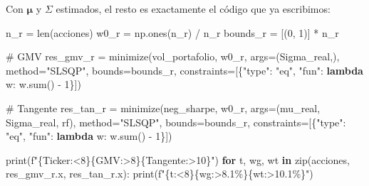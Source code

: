 \documentclass[
  spanish,
  letterpaper,
  DIV=11,
  numbers=noendperiod]{scrreprt}
\newenvironment{Shaded}{\begin{snugshade}}{\end{snugshade}}
\newcommand{\BuiltInTok}[1]{\textcolor[rgb]{0.00,0.23,0.31}{#1}}
\newcommand{\CommentTok}[1]{\textcolor[rgb]{0.37,0.37,0.37}{#1}}
\newcommand{\ControlFlowTok}[1]{\textcolor[rgb]{0.00,0.23,0.31}{\textbf{#1}}}
\newcommand{\DecValTok}[1]{\textcolor[rgb]{0.68,0.00,0.00}{#1}}
\newcommand{\KeywordTok}[1]{\textcolor[rgb]{0.00,0.23,0.31}{\textbf{#1}}}
\newcommand{\NormalTok}[1]{\textcolor[rgb]{0.00,0.23,0.31}{#1}}
\newcommand{\OperatorTok}[1]{\textcolor[rgb]{0.37,0.37,0.37}{#1}}
\newcommand{\SpecialCharTok}[1]{\textcolor[rgb]{0.37,0.37,0.37}{#1}}
\newcommand{\SpecialStringTok}[1]{\textcolor[rgb]{0.13,0.47,0.30}{#1}}
\newcommand{\StringTok}[1]{\textcolor[rgb]{0.13,0.47,0.30}{#1}}
\begin{document}
Con \(\boldsymbol{\mu}\) y \(\Sigma\) estimados, el resto es exactamente
el código que ya escribimos:

\label{datos-reales-optimizacion}
\begin{Shaded}
\begin{Highlighting}[]
\NormalTok{n\_r }\OperatorTok{=} \BuiltInTok{len}\NormalTok{(acciones)}
\NormalTok{w0\_r }\OperatorTok{=}\NormalTok{ np.ones(n\_r) }\OperatorTok{/}\NormalTok{ n\_r}
\NormalTok{bounds\_r }\OperatorTok{=}\NormalTok{ [(}\DecValTok{0}\NormalTok{, }\DecValTok{1}\NormalTok{)] }\OperatorTok{*}\NormalTok{ n\_r}

\CommentTok{\# GMV}
\NormalTok{res\_gmv\_r }\OperatorTok{=}\NormalTok{ minimize(vol\_portafolio, w0\_r, args}\OperatorTok{=}\NormalTok{(Sigma\_real,),}
\NormalTok{                     method}\OperatorTok{=}\StringTok{"SLSQP"}\NormalTok{, bounds}\OperatorTok{=}\NormalTok{bounds\_r,}
\NormalTok{                     constraints}\OperatorTok{=}\NormalTok{[\{}\StringTok{"type"}\NormalTok{: }\StringTok{"eq"}\NormalTok{, }\StringTok{"fun"}\NormalTok{: }\KeywordTok{lambda}\NormalTok{ w: w.}\BuiltInTok{sum}\NormalTok{() }\OperatorTok{{-}} \DecValTok{1}\NormalTok{\}])}

\CommentTok{\# Tangente}
\NormalTok{res\_tan\_r }\OperatorTok{=}\NormalTok{ minimize(neg\_sharpe, w0\_r, args}\OperatorTok{=}\NormalTok{(mu\_real, Sigma\_real, rf),}
\NormalTok{                     method}\OperatorTok{=}\StringTok{"SLSQP"}\NormalTok{, bounds}\OperatorTok{=}\NormalTok{bounds\_r,}
\NormalTok{                     constraints}\OperatorTok{=}\NormalTok{[\{}\StringTok{"type"}\NormalTok{: }\StringTok{"eq"}\NormalTok{, }\StringTok{"fun"}\NormalTok{: }\KeywordTok{lambda}\NormalTok{ w: w.}\BuiltInTok{sum}\NormalTok{() }\OperatorTok{{-}} \DecValTok{1}\NormalTok{\}])}

\BuiltInTok{print}\NormalTok{(}\SpecialStringTok{f"}\SpecialCharTok{\{}\StringTok{\textquotesingle{}Ticker\textquotesingle{}}\SpecialCharTok{:\textless{}8\}\{}\StringTok{\textquotesingle{}GMV\textquotesingle{}}\SpecialCharTok{:\textgreater{}8\}\{}\StringTok{\textquotesingle{}Tangente\textquotesingle{}}\SpecialCharTok{:\textgreater{}10\}}\SpecialStringTok{"}\NormalTok{)}
\ControlFlowTok{for}\NormalTok{ t, wg, wt }\KeywordTok{in} \BuiltInTok{zip}\NormalTok{(acciones, res\_gmv\_r.x, res\_tan\_r.x):}
    \BuiltInTok{print}\NormalTok{(}\SpecialStringTok{f"}\SpecialCharTok{\{}\NormalTok{t}\SpecialCharTok{:\textless{}8\}\{}\NormalTok{wg}\SpecialCharTok{:\textgreater{}8.1\%\}\{}\NormalTok{wt}\SpecialCharTok{:\textgreater{}10.1\%\}}\SpecialStringTok{"}\NormalTok{)}


\end{Highlighting}
\end{Shaded}
\end{document}
